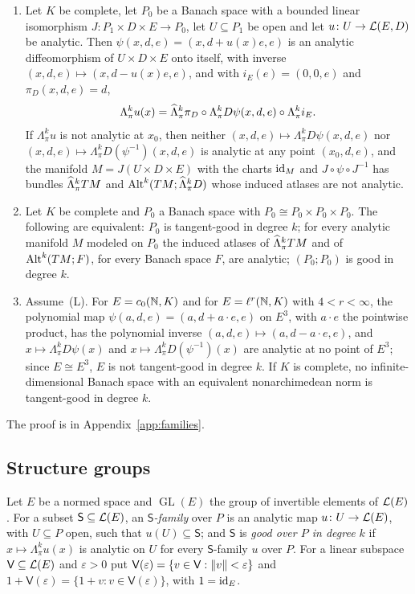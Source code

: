 \begin{theorem}\label{fam2:thm:tangent}
\begin{enumerate}
\item Let $K$ be complete, let $P_0$ be a Banach space with a bounded linear isomorphism $J\colon P_1\times D\times E\to P_0$,
let $U\subseteq P_1$ be open and let $u\colon U\to\mathcal L(E,D)$ be analytic. Then $\psi(x,d,e)=(x,d+u(x)e,e)$ is an analytic
diffeomorphism of $U\times D\times E$ onto itself, with inverse $(x,d,e)\mapsto(x,d-u(x)e,e)$, and with $i_E(e)=(0,0,e)$
and $\pi_D(x,d,e)=d$,
\[
 \Lambda^k_\pi u(x)=\widehat\Lambda^k_\pi\pi_D\circ\Lambda^k_\pi D\psi(x,d,e)\circ\Lambda^k_\pi i_E.
\]
If $\Lambda^k_\pi u$ is not analytic at $x_0$, then neither $(x,d,e)\mapsto\Lambda^k_\pi D\psi(x,d,e)$ nor
$(x,d,e)\mapsto\Lambda^k_\pi D(\psi^{-1})(x,d,e)$ is analytic at any point $(x_0,d,e)$, and the manifold
$M=J(U\times D\times E)$ with the charts $\mathrm{id}_M$ and $J\circ\psi\circ J^{-1}$ has bundles $\widehat\Lambda^k_\pi TM$ and
$\operatorname{Alt}^k(TM;\widehat\Lambda^k_\pi D)$ whose induced atlases are not analytic.
\item Let $K$ be complete and $P_0$ a Banach space with $P_0\cong P_0\times P_0\times P_0$. The following are equivalent:
$P_0$ is tangent-good in degree $k$; for every analytic manifold $M$ modeled on $P_0$ the induced atlases of
$\widehat\Lambda^k_\pi TM$ and of $\operatorname{Alt}^k(TM;F)$, for every Banach space $F$, are analytic; $(P_0;P_0)$ is good in degree $k$.
\item Assume~\textup{(L)}. For $E=c_0(\mathbb N,K)$ and for $E=\ell^r(\mathbb N,K)$ with $4<r<\infty$, the polynomial map
$\psi(a,d,e)=(a,d+a\cdot e,e)$ on $E^3$, with $a\cdot e$ the pointwise product, has the polynomial inverse
$(a,d,e)\mapsto(a,d-a\cdot e,e)$, and $x\mapsto\Lambda^k_\pi D\psi(x)$ and $x\mapsto\Lambda^k_\pi D(\psi^{-1})(x)$ are
analytic at no point of $E^3$; since $E\cong E^3$, $E$ is not tangent-good in degree $k$. If $K$ is complete, no
infinite-dimensional Banach space with an equivalent nonarchimedean norm is tangent-good in degree $k$.
\end{enumerate}
\end{theorem}

The proof is in Appendix~\ref{app:families}.

\subsection{Structure groups}\label{fam2:ssec:groups}

\begin{definition}\label{fam2:def:groups}
Let $E$ be a normed space and $\operatorname{GL}(E)$ the group of invertible elements of $\mathcal L(E)$. For a subset
$\mathsf S\subseteq\mathcal L(E)$, an \emph{$\mathsf S$-family} over $P$ is an analytic map $u\colon U\to\mathcal L(E)$, with $U\subseteq P$
open, such that $u(U)\subseteq\mathsf S$; and $\mathsf S$ is \emph{good over $P$ in degree $k$} if $x\mapsto\Lambda^k_\pi u(x)$
is analytic on $U$ for every $\mathsf S$-family $u$ over $P$. For a linear subspace $\mathsf V\subseteq\mathcal L(E)$ and
$\varepsilon>0$ put $\mathsf V(\varepsilon)=\{v\in\mathsf V:\lVert v\rVert<\varepsilon\}$ and
$1+\mathsf V(\varepsilon)=\{1+v:v\in\mathsf V(\varepsilon)\}$, with $1=\mathrm{id}_E$.
\end{definition}

